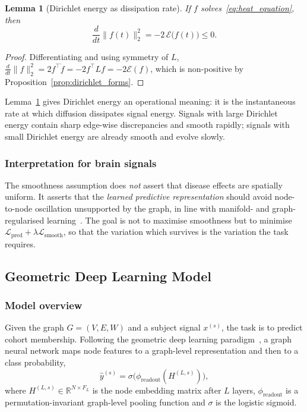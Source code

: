 \documentclass[11pt,reqno]{amsart}
\theoremstyle{plain}
\newtheorem{lemma}[theorem]{Lemma}
\theoremstyle{definition}
\theoremstyle{remark}
\numberwithin{equation}{section}
\newcommand{\R}{\mathbb{R}}
\newcommand{\Lpred}{\mathcal{L}_{\mathrm{pred}}}
\newcommand{\Lsmooth}{\mathcal{L}_{\mathrm{smooth}}}
\begin{document}
\begin{lemma}[Dirichlet energy as dissipation rate]
\label{lem:dissipation}
If $f$ solves~\eqref{eq:heat_equation}, then
\begin{equation}
\frac{d}{dt}\|f(t)\|_2^2 = -2\,\mathcal{E}\big(f(t)\big) \le 0 .
\end{equation}
\end{lemma}

\begin{proof}
Differentiating and using symmetry of $L$,
$\tfrac{d}{dt}\|f\|_2^2 = 2 f^{\top}\dot f = -2 f^{\top} L f = -2\mathcal{E}(f)$,
which is non-positive by Proposition~\ref{prop:dirichlet_forms}.
\end{proof}

Lemma~\ref{lem:dissipation} gives Dirichlet energy an operational meaning: it is
the instantaneous rate at which diffusion dissipates signal energy. Signals with
large Dirichlet energy contain sharp edge-wise discrepancies and smooth rapidly;
signals with small Dirichlet energy are already smooth and evolve slowly.

\subsubsection{Interpretation for brain signals}

The smoothness assumption does \emph{not} assert that disease effects are
spatially uniform. It asserts that the \emph{learned predictive representation}
should avoid node-to-node oscillation unsupported by the graph, in line with
manifold- and graph-regularised
learning~\cite{belkin2003laplacian,zhou2004learning}. The goal is not to
maximise smoothness but to minimise $\Lpred + \lambda\Lsmooth$, so that the
variation which survives is the variation the task requires.

\subsection{Geometric Deep Learning Model}
\label{sec:gdl}

\subsubsection{Model overview}

Given the graph $G=(V,E,W)$ and a subject signal $x^{(s)}$, the task is to
predict cohort membership. Following the geometric deep learning
paradigm~\cite{bronstein2017geometric,bronstein2021geometric,wu2021comprehensive},
a graph neural network maps node features to a graph-level representation and
then to a class probability,
\begin{equation}
\hat y^{(s)} = \sigma\!\big(\phi_{\mathrm{readout}}(H^{(L,s)})\big),
\end{equation}
where $H^{(L,s)}\in\R^{N\times F_L}$ is the node embedding matrix after $L$
layers, $\phi_{\mathrm{readout}}$ is a permutation-invariant graph-level pooling
function and $\sigma$ is the logistic sigmoid.
\end{document}
